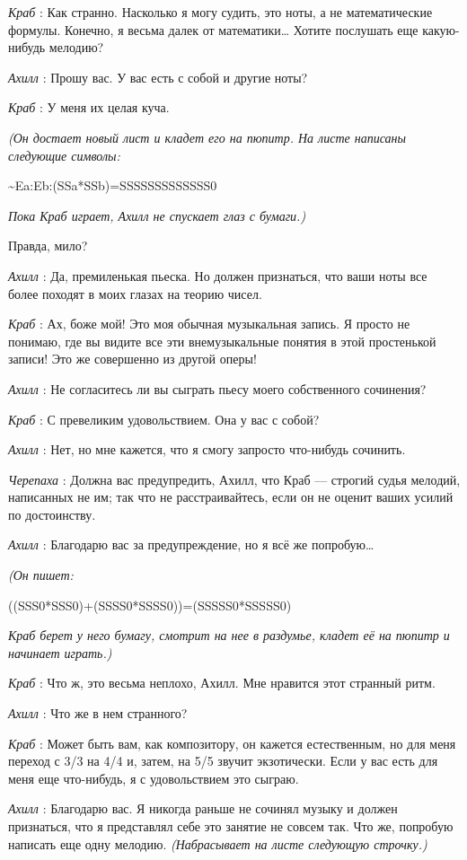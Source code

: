 \documentclass[../main.tex]{subfiles}
\begin{document}
\begin{dialogue}
\emph{Краб} : Как странно. Насколько я могу судить, это ноты, а не математические формулы. Конечно, я весьма далек от математики\ldots{} Хотите послушать еще какую-нибудь мелодию?

\emph{Ахилл} : Прошу вас. У вас есть с собой и другие ноты?

\emph{Краб} : У меня их целая куча.

\emph{(Он достает новый лист и кладет его на пюпитр. На листе написаны следующие символы:}

\textasciitilde Ea:Eb:(SSa*SSb)=SSSSSSSSSSSSS0

\emph{Пока Краб играет, Ахилл не спускает глаз с бумаги.)}

Правда, мило?

\emph{Ахилл} : Да, премиленькая пьеска. Но должен признаться, что ваши ноты все более походят в моих глазах на теорию чисел.

\emph{Краб} : Ах, боже мой! Это моя обычная музыкальная запись. Я просто не понимаю, где вы видите все эти внемузыкальные понятия в этой простенькой записи! Это же совершенно из другой оперы!

\emph{Ахилл} : Не согласитесь ли вы сыграть пьесу моего собственного сочинения?

\emph{Краб} : С превеликим удовольствием. Она у вас с собой?

\emph{Ахилл} : Нет, но мне кажется, что я смогу запросто что-нибудь сочинить.

\emph{Черепаха} : Должна вас предупредить, Ахилл, что Краб --- строгий судья мелодий, написанных не им; так что не расстраивайтесь, если он не оценит ваших усилий по достоинству.

\emph{Ахилл} : Благодарю вас за предупреждение, но я всё же попробую\ldots{}

\emph{(Он пишет:}

((SSS0*SSS0)+(SSSS0*SSSS0))=(SSSSS0*SSSSS0)

\emph{Краб берет у него бумагу, смотрит на нее в раздумье, кладет её на пюпитр и начинает играть.)}

\emph{Краб} : Что ж, это весьма неплохо, Ахилл. Мне нравится этот странный ритм.

\emph{Ахилл} : Что же в нем странного?

\emph{Краб} : Может быть вам, как композитору, он кажется естественным, но для меня переход с 3/3 на 4/4 и, затем, на 5/5 звучит экзотически. Если у вас есть для меня еще что-нибудь, я с удовольствием это сыграю.

\emph{Ахилл} : Благодарю вас. Я никогда раньше не сочинял музыку и должен признаться, что я представлял себе это занятие не совсем так. Что же, попробую написать еще одну мелодию. \emph{(Набрасывает на листе следующую строчку.)}


\end{dialogue}
\end{document}
